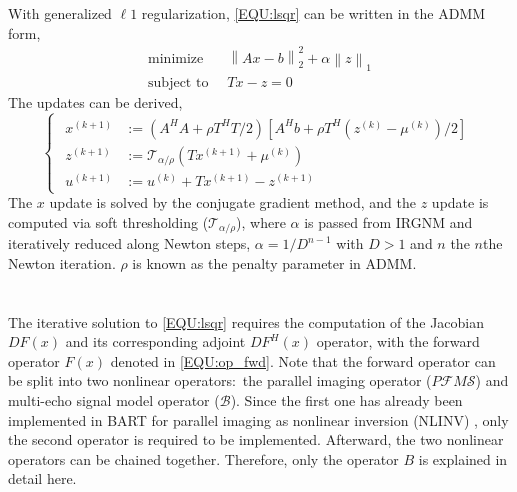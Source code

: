 \documentclass[journal,twoside,web]{ieeecolor}
\newcommand*{\norm}[1]{\left\lVert#1\right\rVert}
\begin{document}
\begin{appendices}
With generalized $\ell1$ regularization, \cref{EQU:lsqr} can be written in the ADMM form,
\begin{equation} \label{EQU:ADMM_LASSO}
\begin{split}
\textrm{minimize}\;\; &\norm{Ax - b}_2^2 + \alpha \norm{z}_1 \\
\textrm{subject to}\;\; &Tx - z = 0
\end{split}
\end{equation}
The updates can be derived,
\begin{equation} \label{EQU:ADMM_LASSO_upd}
\left\{\begin{matrix}
\begin{aligned}
x^{(k+1)} &:= (A^H A + \rho T^H T / 2) [A^H b + \rho T^H (z^{(k)} - \mu^{(k)})/2] \\ 
z^{(k+1)} &:= \mathcal{T}_{\alpha/\rho} (T x^{(k+1)} + \mu^{(k)}) \\
u^{(k+1)} &:= u^{(k)} + T x^{(k+1)} - z^{(k+1)}
\end{aligned}
\end{matrix}\right.
\end{equation}
The $x$ update is solved by the conjugate gradient method, 
and the $z$ update is computed via soft thresholding ($\mathcal{T}_{\alpha/\rho}$), 
where $\alpha$ is passed from IRGNM and iteratively reduced along Newton steps, 
$\alpha = 1/D^{n-1}$ with $D > 1$ and $n$ the $n$the Newton iteration. 
$\rho$ is known as the penalty parameter in ADMM. 

\section{}
\label{SEC:APPENDIXB}

The iterative solution to \cref{EQU:lsqr} requires the computation of the Jacobian $DF(x)$ 
and its corresponding adjoint $DF^H (x)$ operator, with the forward operator $F(x)$ denoted 
in \cref{EQU:op_fwd}. 
Note that the forward operator can be split into 
two nonlinear operators:~the parallel imaging operator ($P\mathcal{F} M \mathcal{S}$) 
and multi-echo signal model operator ($\mathcal{B}$). 
Since the first one has already been implemented 
in BART for parallel imaging as nonlinear inversion (NLINV) \cite{uecker_2008_nlinv}, 
only the second operator is required to be implemented.
Afterward, the two nonlinear operators can be chained together. 
Therefore, only the operator $B$ is explained in detail here.


\end{appendices}
\end{document}
